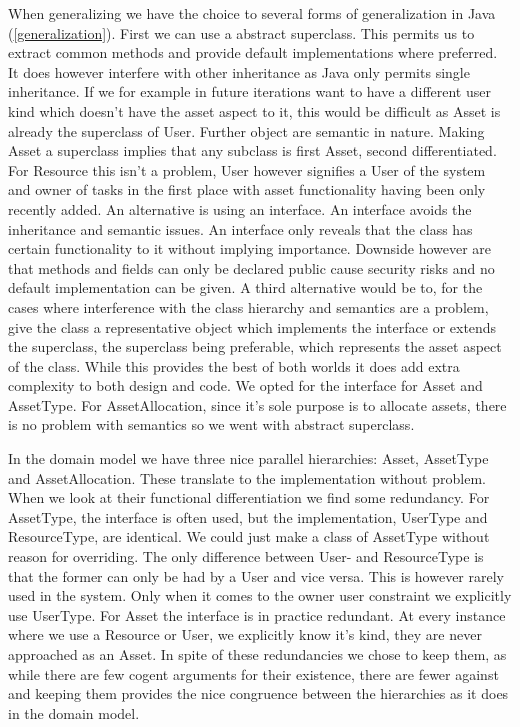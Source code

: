 				When generalizing we have the choice to several forms of generalization in Java (\ref{generalization}). First we can use a abstract superclass. This permits us to extract common methods and provide default implementations where preferred. It does however interfere with other inheritance as Java only permits single inheritance. If we for example in future iterations want to have a different user kind which doesn't have the asset aspect to it, this would be difficult as Asset is already the superclass of User. Further object are semantic in nature. Making Asset a superclass implies that any subclass is first Asset, second differentiated. For Resource this isn't a problem, User however signifies a User of the system and owner of tasks in the first place with asset functionality having been only recently added. An alternative is using an interface. An interface avoids the inheritance and semantic issues. An interface only reveals that the class has certain functionality to it without implying importance. Downside however are that methods and fields can only be declared public cause security risks and no default implementation can be given. A third alternative would be to, for the cases where interference with the class hierarchy and semantics are a problem, give the class a representative object which implements the interface or extends the superclass, the superclass being preferable, which represents the asset aspect of the class. While this provides the best of both worlds it does add extra complexity to both design and code. We opted for the interface for Asset and AssetType. For AssetAllocation, since it's sole purpose is to allocate assets, there is no problem with semantics so we went with abstract superclass.
				
				In the domain model we have three nice parallel hierarchies: Asset, AssetType and AssetAllocation. These translate to the implementation without problem. When we look at their functional differentiation we find some redundancy. For AssetType, the interface is often used, but the implementation, UserType and ResourceType, are identical. We could just make a class of AssetType without reason for overriding. The only difference between User- and ResourceType is that the former can only be had by a User and vice versa. This is however rarely used in the system. Only when it comes to the owner user constraint we explicitly use UserType. For Asset the interface is in practice redundant. At every instance where we use a Resource or User, we explicitly know it's kind, they are never approached as an Asset. In spite of these redundancies we chose to keep them, as while there are few cogent arguments for their existence, there are fewer against and keeping them provides the nice congruence between the hierarchies as it does in the domain model.
				
